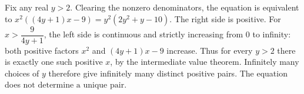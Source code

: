 Fix any real $y>2$. Clearing the nonzero denominators, the equation is equivalent to $x^2((4y+1)x-9)=y^2(2y^2+y-10)$. The right side is positive. For $x>\dfrac{9}{4y+1}$, the left side is continuous and strictly increasing from $0$ to infinity: both positive factors $x^2$ and $(4y+1)x-9$ increase. Thus for every $y>2$ there is exactly one such positive $x$, by the intermediate value theorem. Infinitely many choices of $y$ therefore give infinitely many distinct positive pairs. The equation does $\boxed{\text{not determine a unique pair}}$.
